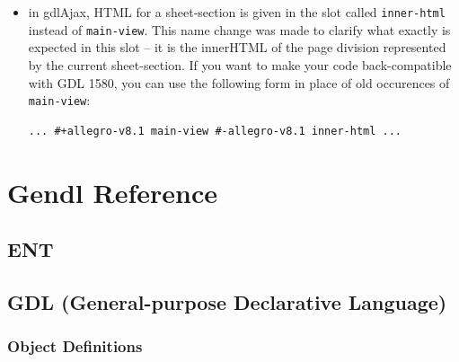 \documentclass [11pt]{book}
\begin{document}
\begin{itemize}
\item in gdlAjax, HTML for a sheet-section is given in the slot called \texttt{inner-html} instead of \texttt{main-view}. This name change was made to clarify what exactly is
	 expected in this slot -- it is the innerHTML of the page
	 division represented by the current sheet-section. If you
	 want to make your code back-compatible with GDL 1580, you can
	 use the following form in place of old occurences of \texttt{main-view}: 

\begin{verbatim}... #+allegro-v8.1 main-view #-allegro-v8.1 inner-html ...
\end{verbatim}

\end{itemize}



\chapter{Gendl Reference}

\label{chap:gendlreference}



\section{ENT }

\label{sec:ent}







\section{GDL (General-purpose Declarative Language)}

\label{sec:gdl(general-purposedeclarativelanguage)}





\subsection{Object Definitions}

\label{subsec:objectdefinitions}
\end{document}
